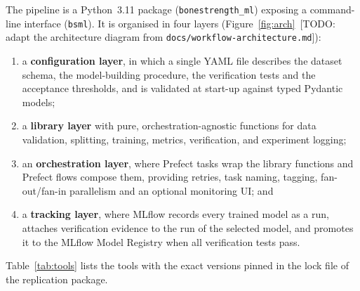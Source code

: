 The pipeline is a Python~3.11 package (\texttt{bonestrength\_ml}) exposing a
command-line interface (\texttt{bsml}). It is organised in four layers
(Figure~\ref{fig:arch}~[TODO: adapt the architecture diagram from
\texttt{docs/workflow-architecture.md}]):

\begin{enumerate}
  \item a \textbf{configuration layer}, in which a single YAML file describes
    the dataset schema, the model-building procedure, the verification tests
    and the acceptance thresholds, and is validated at start-up against
    typed Pydantic models;
  \item a \textbf{library layer} with pure, orchestration-agnostic functions
    for data validation, splitting, training, metrics, verification, and
    experiment logging;
  \item an \textbf{orchestration layer}, where Prefect tasks wrap the library
    functions and Prefect flows compose them, providing retries, task
    naming, tagging, fan-out/fan-in parallelism and an optional monitoring
    UI; and
  \item a \textbf{tracking layer}, where MLflow records every trained model as
    a run, attaches verification evidence to the run of the selected model,
    and promotes it to the MLflow Model Registry when all verification
    tests pass.
\end{enumerate}

Table~\ref{tab:tools} lists the tools with the exact versions pinned in the
lock file of the replication package.

